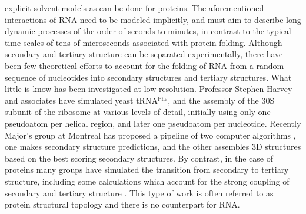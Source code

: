 explicit   solvent  models   as  can   be  done   for   proteins.  The
aforementioned interactions of RNA  need to be modeled implicitly, and
must aim to describe long dynamic processes of the order of seconds to
minutes,  in  contrast   to  the  typical  time  scales   of  tens  of
microseconds associated with protein folding.
Although   secondary   and  tertiary   structure   can  be   separated
experimentally, there have been few theoretical efforts to account for
the  folding  of  RNA  from  a random  sequence  of  nucleotides  into
secondary structures and tertiary  structures. What little is know has
been  investigated at  low  resolution. Professor  Stephen Harvey  and
associates     have     simulated     yeast     tRNA$^{\textrm{Phe}}$,
\cite{malhotra1990}  and  the  assembly  of  the 30S  subunit  of  the
ribosome \cite{stagg2003} at various levels of detail, initially using
only one pseudoatom  per helical region, and later  one pseudoatom per
nucleotide. Recently Major's group at Montreal has proposed a pipeline
of  two computer algorithms  \cite{parisien2008}, one  makes secondary
structure predictions, and the  other assembles 3D structures based on
the best scoring  secondary structures.
By contrast,  in the case of  proteins many groups  have simulated the
transition  from  secondary  to  tertiary  structure,  including  some
calculations which  account for the  strong coupling of  secondary and
tertiary  structure   \cite{westhead1999,  gerstein2003,  meiler2003}.
This type of work is  often referred to as protein structural topology
and there is no counterpart for RNA.

